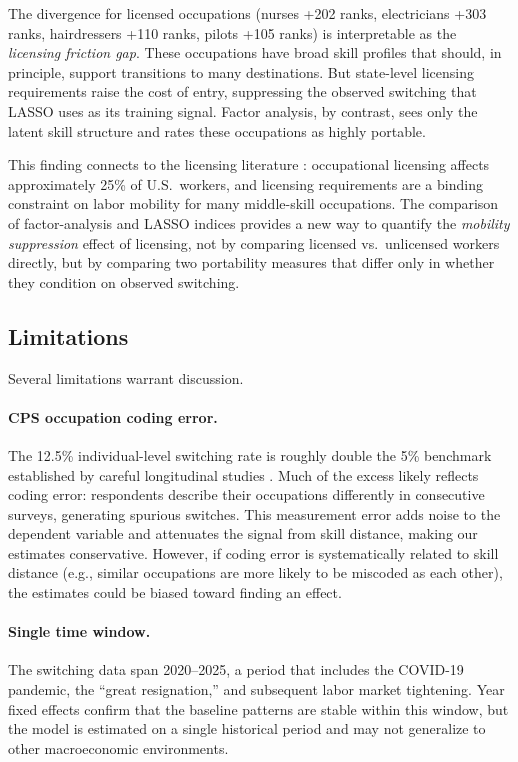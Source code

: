 \documentclass[12pt]{article}
\begin{document}
The divergence for licensed occupations (nurses +202 ranks, electricians +303 ranks, hairdressers +110 ranks, pilots +105 ranks) is interpretable as the \emph{licensing friction gap}. These occupations have broad skill profiles that should, in principle, support transitions to many destinations. But state-level licensing requirements raise the cost of entry, suppressing the observed switching that LASSO uses as its training signal. Factor analysis, by contrast, sees only the latent skill structure and rates these occupations as highly portable.

This finding connects to the licensing literature \citep{kleiner2013}: occupational licensing affects approximately 25\% of U.S.\ workers, and licensing requirements are a binding constraint on labor mobility for many middle-skill occupations. The comparison of factor-analysis and LASSO indices provides a new way to quantify the \emph{mobility suppression} effect of licensing, not by comparing licensed vs.\ unlicensed workers directly, but by comparing two portability measures that differ only in whether they condition on observed switching.

\subsection{Limitations}

Several limitations warrant discussion.

\paragraph{CPS occupation coding error.} The 12.5\% individual-level switching rate is roughly double the 5\% benchmark established by careful longitudinal studies \citep{kambourov2008}. Much of the excess likely reflects coding error: respondents describe their occupations differently in consecutive surveys, generating spurious switches. This measurement error adds noise to the dependent variable and attenuates the signal from skill distance, making our estimates conservative. However, if coding error is systematically related to skill distance (e.g., similar occupations are more likely to be miscoded as each other), the estimates could be biased toward finding an effect.

\paragraph{Single time window.} The switching data span 2020--2025, a period that includes the COVID-19 pandemic, the ``great resignation,'' and subsequent labor market tightening. Year fixed effects confirm that the baseline patterns are stable within this window, but the model is estimated on a single historical period and may not generalize to other macroeconomic environments.
\end{document}
